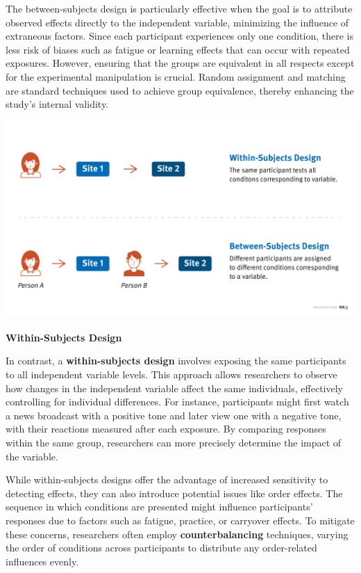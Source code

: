 \documentclass[
]{book}
\begin{document}
The between-subjects design is particularly effective when the goal is to attribute observed effects directly to the independent variable, minimizing the influence of extraneous factors. Since each participant experiences only one condition, there is less risk of biases such as fatigue or learning effects that can occur with repeated exposures. However, ensuring that the groups are equivalent in all respects except for the experimental manipulation is crucial. Random assignment and matching are standard techniques used to achieve group equivalence, thereby enhancing the study's internal validity.

\href{https://www.nngroup.com/articles/between-within-subjects/}{\includegraphics[width=1\linewidth,height=\textheight,keepaspectratio]{images/subject-design-graphic.jpg}}

\textbf{Within-Subjects Design}

In contrast, a \textbf{within-subjects design} involves exposing the same participants to all independent variable levels. This approach allows researchers to observe how changes in the independent variable affect the same individuals, effectively controlling for individual differences. For instance, participants might first watch a news broadcast with a positive tone and later view one with a negative tone, with their reactions measured after each exposure. By comparing responses within the same group, researchers can more precisely determine the impact of the variable.

While within-subjects designs offer the advantage of increased sensitivity to detecting effects, they can also introduce potential issues like order effects. The sequence in which conditions are presented might influence participants' responses due to factors such as fatigue, practice, or carryover effects. To mitigate these concerns, researchers often employ \textbf{counterbalancing} techniques, varying the order of conditions across participants to distribute any order-related influences evenly.
\end{document}
